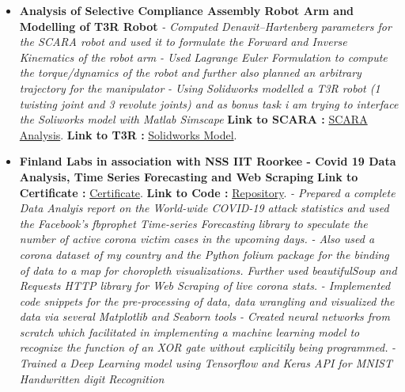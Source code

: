 \documentclass[a4paper,12pt]{article}
\begin{document}
\begin{itemize}
    \item{\textbf{\large{Analysis of Selective Compliance Assembly Robot Arm and Modelling of T3R Robot}}
    \newline
    \textit{- Computed Denavit–Hartenberg parameters for the SCARA robot and used it to formulate the Forward and Inverse Kinematics of the robot arm} 
    \newline
    \textit{- Used Lagrange Euler Formulation to compute the torque/dynamics of the robot and further also planned an arbitrary trajectory for the manipulator} 
    \newline
    \textit{- Using Solidworks modelled a T3R robot (1 twisting joint and 3 revolute joints) and as bonus task i am trying to interface the Soliworks model with Matlab Simscape}} 
    \newline
    \textbf{ Link to SCARA :} \href{https://github.com/teetangh/Robotics-Projects/blob/master/SCARA_Robot_Analysis.pdf}{SCARA Analysis}.
    \textbf{ Link to T3R :} \href{https://github.com/teetangh/Robotics-Projects}{Solidworks Model}.
    \newline
    \item{\textbf{\large{Finland Labs in association with NSS IIT Roorkee - Covid 19 Data Analysis, Time Series Forecasting and Web Scraping}}
    \newline
    \textbf{Link to Certificate :} \href{https://github.com/teetangh/Kaustav-All-Certifications/blob/master/Artificial%20Intelligence/Finland%20Labs%20and%20IITR/Covid%2019%20Analysis%20-%20AI%20and%20ML.pdf}{Certificate}.
    \newline
    \textbf{ Link to Code :} \href{https://github.com/teetangh/FinlandLabs-IITR-COVID-19-Analysis}{Repository}.
    \newline
    \textit{- Prepared a complete Data Analyis report on the World-wide COVID-19 attack statistics and used the Facebook's fbprophet Time-series Forecasting library to speculate the number of active corona victim cases in the upcoming days.} 
    \newline
    \textit{- Also used a corona dataset of my country and the Python folium package for the binding of data to a map for choropleth visualizations. Further used beautifulSoup and Requests HTTP library for Web Scraping of live corona stats.}
    \newline
    \textit{- Implemented code snippets for the pre-processing of data, data wrangling and visualized the data via several Matplotlib and Seaborn tools }
    \newline
    \textit{- Created neural networks from scratch which facilitated in implementing a machine learning model to recognize the function of an XOR gate without explicitily being programmed.}
    \newline
    \textit{- Trained a Deep Learning model using Tensorflow and Keras API for MNIST Handwritten digit Recognition}}
    
\end{itemize}
\end{document}
